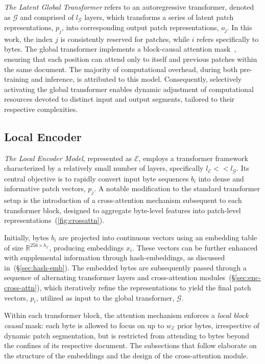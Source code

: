 \textit{The Latent Global Transformer} refers to an autoregressive transformer, denoted as $\mathcal{G}$ and comprised of $l_{\mathcal{G}}$ layers, which transforms a series of latent patch representations, $p_j$, into corresponding output patch representations, $o_j$. In this work, the index $j$ is consistently reserved for patches, while $i$ refers specifically to bytes. The global transformer implements a block-causal attention mask~\citep{dubey2024llama}, ensuring that each position can attend only to itself and previous patches within the same document. The majority of computational overhead, during both pre-training and inference, is attributed to this model. Consequently, selectively activating the global transformer enables dynamic adjustment of computational resources devoted to distinct input and output segments, tailored to their respective complexities.

\subsection{Local Encoder}
\label{section:local}

\textit{The Local Encoder Model}, represented as $\mathcal{E}$, employs a transformer framework characterized by a relatively small number of layers, specifically $l_{\mathcal{E}} << l_{\mathcal{G}}$. Its central objective is to rapidly convert input byte sequences $b_i$ into dense and informative patch vectors, $p_j$. A notable modification to the standard transformer setup is the introduction of a cross-attention mechanism subsequent to each transformer block, designed to aggregate byte-level features into patch-level representations~(\autoref{fig:crossattn}).

Initially, bytes $b_i$ are projected into continuous vectors using an embedding table of size $\mathbb{R}^{256 \times h_{\mathcal{E}}}$, producing embeddings $x_i$. These vectors can be further enhanced with supplemental information through hash-embeddings, as discussed in~(\S\ref{sec:hash-emb}). The embedded bytes are subsequently passed through a sequence of alternating transformer layers and cross-attention modules~(\S\ref{sec:enc-cross-attn}), which iteratively refine the representations to yield the final patch vectors, $p_i$, utilized as input to the global transformer, $\mathcal{G}$.

Within each transformer block, the attention mechanism enforces a \textit{local block causal} mask: each byte is allowed to focus on up to $w_{\mathcal{E}}$ prior bytes, irrespective of dynamic patch segmentation, but is restricted from attending to bytes beyond the confines of its respective document. The subsections that follow elaborate on the structure of the embeddings and the design of the cross-attention module.

